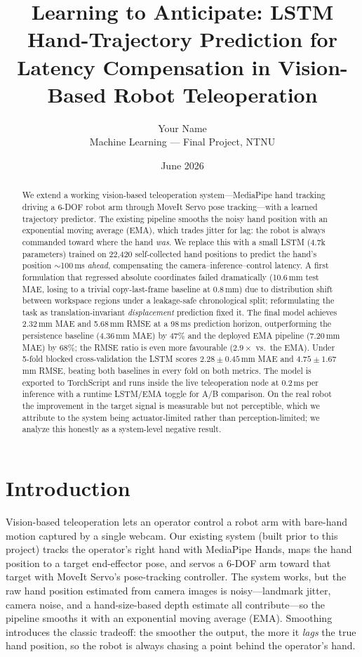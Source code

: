 \documentclass[11pt,a4paper]{article}
\title{Learning to Anticipate: LSTM Hand-Trajectory Prediction for
       Latency Compensation in Vision-Based Robot Teleoperation}
\author{Your Name\\ \small Machine Learning --- Final Project, NTNU}
\date{June 2026}
\begin{document}
\maketitle

\begin{abstract}
We extend a working vision-based teleoperation system---MediaPipe hand tracking
driving a 6-DOF robot arm through MoveIt Servo pose tracking---with a learned
trajectory predictor. The existing pipeline smooths the noisy hand position with
an exponential moving average (EMA), which trades jitter for lag: the robot is
always commanded toward where the hand \emph{was}. We replace this with a small
LSTM (4.7k parameters) trained on 22{,}420 self-collected hand positions to
predict the hand's position $\sim$100\,ms \emph{ahead}, compensating the
camera--inference--control latency. A first formulation that regressed absolute
coordinates failed dramatically (10.6\,mm test MAE, losing to a trivial
copy-last-frame baseline at 0.8\,mm) due to distribution shift between
workspace regions under a leakage-safe chronological split; reformulating the
task as translation-invariant \emph{displacement} prediction fixed it. The
final model achieves 2.32\,mm MAE and 5.68\,mm RMSE at a 98\,ms prediction horizon,
outperforming the persistence baseline (4.36\,mm MAE) by 47\% and the deployed EMA
pipeline (7.20\,mm MAE) by 68\%; the RMSE ratio is even more favourable ($2.9{\times}$
vs.\ the EMA). Under 5-fold blocked cross-validation the LSTM scores
$2.28 \pm 0.45$\,mm MAE and $4.75 \pm 1.67$\,mm RMSE, beating both baselines in every
fold on both metrics. The model is exported to TorchScript and runs
inside the live teleoperation node at 0.2\,ms per inference with a runtime
LSTM/EMA toggle for A/B comparison. On the real robot the improvement in the
target signal is measurable but not perceptible, which we attribute to the
system being actuator-limited rather than perception-limited; we analyze this
honestly as a system-level negative result.
\end{abstract}

\section{Introduction}

Vision-based teleoperation lets an operator control a robot arm with bare-hand
motion captured by a single webcam. Our existing system (built prior to this
project) tracks the operator's right hand with MediaPipe Hands, maps the hand
position to a target end-effector pose, and servos a 6-DOF arm toward that
target with MoveIt Servo's pose-tracking controller. The system works, but the
raw hand position estimated from camera images is noisy---landmark jitter,
camera noise, and a hand-size-based depth estimate all contribute---so the
pipeline smooths it with an exponential moving average (EMA). Smoothing
introduces the classic tradeoff: the smoother the output, the more it
\emph{lags} the true hand position, so the robot is always chasing a point
behind the operator's hand.
\end{document}
